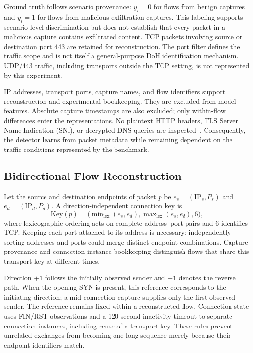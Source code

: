 \documentclass[conference]{IEEEtran}
\begin{document}
Ground truth follows scenario provenance: $y_i=0$ for flows from benign captures and $y_i=1$ for flows from malicious exfiltration captures. This labeling supports scenario-level discrimination but does not establish that every packet in a malicious capture contains exfiltrated content. TCP packets involving source or destination port 443 are retained for reconstruction. The port filter defines the traffic scope and is not itself a general-purpose DoH identification mechanism. UDP/443 traffic, including transports outside the TCP setting, is not represented by this experiment.

IP addresses, transport ports, capture names, and flow identifiers support reconstruction and experimental bookkeeping. They are excluded from model features. Absolute capture timestamps are also excluded; only within-flow differences enter the representations. No plaintext HTTP headers, TLS Server Name Indication (SNI), or decrypted DNS queries are inspected~\cite{jerabek2023,behnke2021}. Consequently, the detector learns from packet metadata while remaining dependent on the traffic conditions represented by the benchmark.

\subsection{Bidirectional Flow Reconstruction}
Let the source and destination endpoints of packet $p$ be $e_s=(\mathrm{IP}_s,P_s)$ and $e_d=(\mathrm{IP}_d,P_d)$. A direction-independent connection key is
\begin{equation}
\mathrm{Key}(p)=
\big(\min\nolimits_{\mathrm{lex}}(e_s,e_d),
     \max\nolimits_{\mathrm{lex}}(e_s,e_d),6\big),
\label{eq:flow_key}
\end{equation}
where lexicographic ordering acts on complete address--port pairs and 6 identifies TCP. Keeping each port attached to its address is necessary: independently sorting addresses and ports could merge distinct endpoint combinations. Capture provenance and connection-instance bookkeeping distinguish flows that share this transport key at different times.

Direction $+1$ follows the initially observed sender and $-1$ denotes the reverse path. When the opening SYN is present, this reference corresponds to the initiating direction; a mid-connection capture supplies only the first observed sender. The reference remains fixed within a reconstructed flow. Connection state uses FIN/RST observations and a 120-second inactivity timeout to separate connection instances, including reuse of a transport key. These rules prevent unrelated exchanges from becoming one long sequence merely because their endpoint identifiers match.
\end{document}
